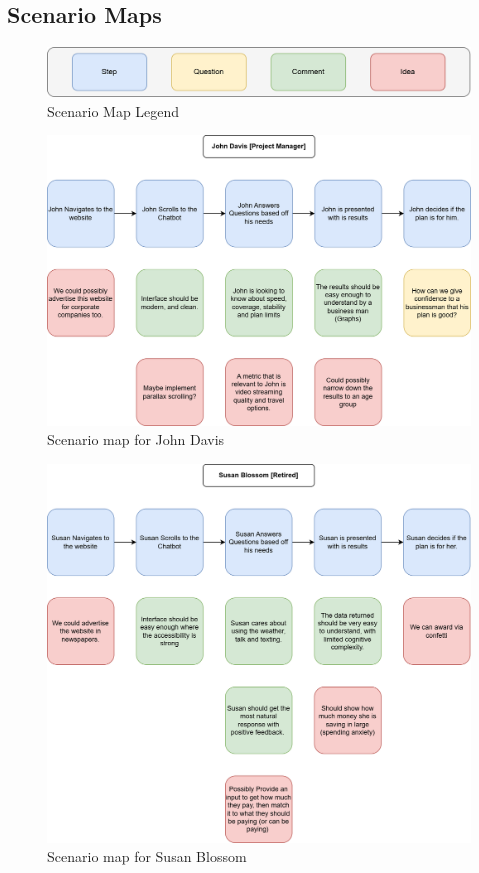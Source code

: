 \documentclass[conference]{IEEEtran}
\begin{document}
\subsection{Scenario Maps}
\begin{figure}[H]
    \centering
    \includegraphics[width=1\linewidth]{ScenarioMap_Legend.drawio.png}
    \caption{Scenario Map Legend}
    \label{fig:scenario-map-legend}
\end{figure}

\begin{figure}[H]
    \centering
    \includegraphics[width=1\linewidth]{ScenarioMap_John.drawio.png}
    \caption{Scenario map for John Davis}
    \label{fig:scenario-map-John}
\end{figure}

\begin{figure}[H]
    \centering
    \includegraphics[width=1\linewidth]{ScenarioMap_Susan.drawio.png}
    \caption{Scenario map for Susan Blossom}
    \label{fig:scenario-map-Susan}
\end{figure}
\end{document}
